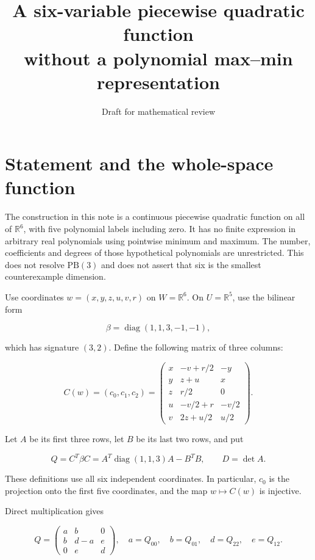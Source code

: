 \documentclass[11pt]{article}
\title{A six-variable piecewise quadratic function\\
without a polynomial max--min representation}
\author{}
\date{\small Draft for mathematical review}
\begin{document}
\maketitle
\vspace{-1em}

\section{Statement and the whole-space function}

The construction in this note is a continuous piecewise quadratic function on
all of \(\mathbb R^6\), with five polynomial labels including zero. It has no
finite expression in arbitrary real polynomials using pointwise minimum and
maximum. The number, coefficients and degrees of those hypothetical
polynomials are unrestricted. This does not resolve \(\mathrm{PB}(3)\) and
does not assert that six is the smallest counterexample dimension.

Use coordinates \(w=(x,y,z,u,v,r)\) on \(W=\mathbb R^6\). On
\(U=\mathbb R^5\), use the bilinear form

\[
\beta=\operatorname{diag}(1,1,3,-1,-1),
\]

which has signature \((3,2)\). Define the following matrix of three columns:

\[
C(w)=(c_0,c_1,c_2)=
\begin{pmatrix}
x&-v+r/2&-y\\
y&z+u&x\\
z&r/2&0\\
u&-v/2+r&-v/2\\
v&2z+u/2&u/2
\end{pmatrix}.
\tag{1}
\]

Let \(A\) be its first three rows, let \(B\) be its last two rows, and put

\[
Q=C^T\beta C=A^T\operatorname{diag}(1,1,3)A-B^TB,
\qquad D=\det A.
\tag{2}
\]

These definitions use all six independent coordinates. In particular,
\(c_0\) is the projection onto the first five coordinates, and the map
\(w\mapsto C(w)\) is injective.

Direct multiplication gives

\[
Q=\begin{pmatrix}a&b&0\\b&d-a&e\\0&e&d\end{pmatrix},
\quad a=Q_{00},\quad b=Q_{01},\quad d=Q_{22},\quad e=Q_{12}.
\tag{3}
\]
\end{document}
